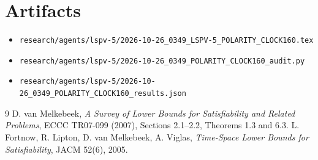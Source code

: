 \documentclass[11pt]{article}
\begin{document}
\section*{Artifacts}
\begin{itemize}
\item \texttt{research/agents/lspv-5/2026-10-26\_0349\_LSPV-5\_POLARITY\_CLOCK160.tex}
\item \texttt{research/agents/lspv-5/2026-10-26\_0349\_POLARITY\_CLOCK160\_audit.py}
\item \texttt{research/agents/lspv-5/2026-10-26\_0349\_POLARITY\_CLOCK160\_results.json}
\end{itemize}

\begin{thebibliography}{9}
 D. van Melkebeek, \emph{A Survey of Lower Bounds for
Satisfiability and Related Problems}, ECCC TR07-099 (2007), Sections 2.1--2.2,
Theorems 1.3 and 6.3.
 L. Fortnow, R. Lipton, D. van Melkebeek, A. Viglas,
\emph{Time-Space Lower Bounds for Satisfiability}, JACM 52(6), 2005.
\end{thebibliography}

\end{document}
